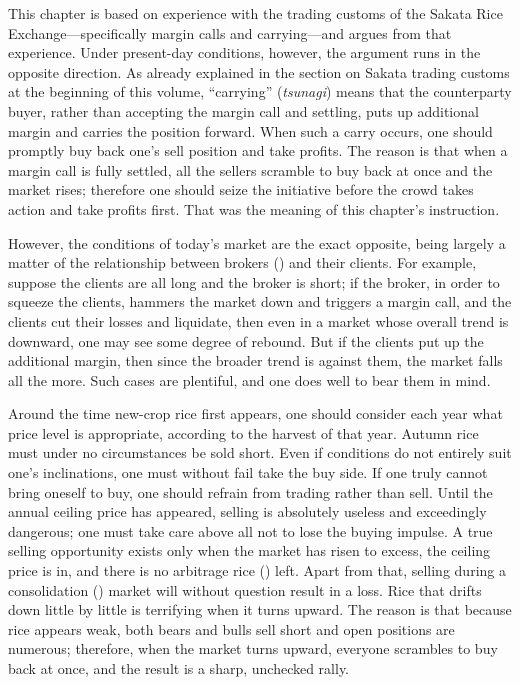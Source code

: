 \commentary
This chapter is based on experience with the trading customs of the
Sakata Rice Exchange---specifically margin calls and carrying---and
argues from that experience. Under present-day conditions, however, the
argument runs in the opposite direction. As already explained in the
section on Sakata trading customs at the beginning of this volume,
``carrying'' (\textit{tsunagi}) means that the counterparty buyer,
rather than accepting the margin call and settling, puts up additional
margin and carries the position forward. When such a carry occurs, one
should promptly buy back one's sell position and take profits. The
reason is that when a margin call is fully settled, all the sellers
scramble to buy back at once and the market rises; therefore one should
seize the initiative before the crowd takes action and take profits
first. That was the meaning of this chapter's instruction.

However, the conditions of today's market are the exact opposite, being
largely a matter of the relationship between brokers ()
and their clients. For example, suppose the clients are all long and the
broker is short; if the broker, in order to squeeze the clients, hammers
the market down and triggers a margin call, and the clients cut their
losses and liquidate, then even in a market whose overall trend is
downward, one may see some degree of rebound. But if the clients put up
the additional margin, then since the broader trend is against them, the
market falls all the more. Such cases are plentiful, and one does well
to bear them in mind.


\begin{sokyubox}
{\small\itshape\color{sokyubar} }

\medskip
Around the time new-crop rice first appears, one should consider each
year what price level is appropriate, according to the harvest of that
year. Autumn rice must under no circumstances be sold short. Even if
conditions do not entirely suit one's inclinations, one must without
fail take the buy side. If one truly cannot bring oneself to buy, one
should refrain from trading rather than sell. Until the annual ceiling
price has appeared, selling is absolutely useless and exceedingly
dangerous; one must take care above all not to lose the buying impulse.
A true selling opportunity exists only when the market has risen to
excess, the ceiling price is in, and there is no arbitrage rice
() left. Apart from that, selling during a
consolidation () market will without question result in
a loss. Rice that drifts down little by little is terrifying when it
turns upward. The reason is that because rice appears weak, both bears
and bulls sell short and open positions are numerous; therefore, when the market turns
upward, everyone scrambles to buy back at once, and the result is a
sharp, unchecked rally.
\end{sokyubox}

